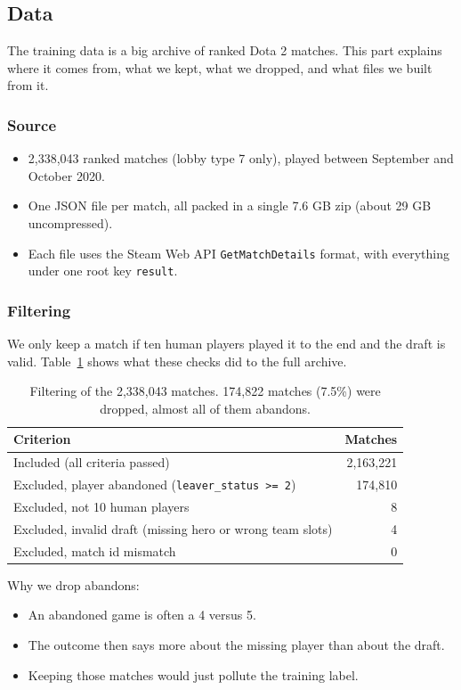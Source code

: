 \documentclass{article}
\begin{document}
\subsection{Data}
The training data is a big archive of ranked Dota 2 matches. This part explains where it comes from, what we kept, what we dropped, and what files we built from it.

\subsubsection*{Source}
\begin{itemize}
    \item 2,338,043 ranked matches (lobby type 7 only), played between September and October 2020.
    \item One JSON file per match, all packed in a single 7.6 GB zip (about 29 GB uncompressed).
    \item Each file uses the Steam Web API \texttt{GetMatchDetails} format, with everything under one root key \texttt{result}.
\end{itemize}

\subsubsection*{Filtering}
We only keep a match if ten human players played it to the end and the draft is valid. Table~\ref{tab:exclusions} shows what these checks did to the full archive.

\begin{table}[h]
\centering
\begin{tabular}{lr}
\toprule
Criterion & Matches \\
\midrule
Included (all criteria passed) & 2,163,221 \\
Excluded, player abandoned (\texttt{leaver\_status >= 2}) & 174,810 \\
Excluded, not 10 human players & 8 \\
Excluded, invalid draft (missing hero or wrong team slots) & 4 \\
Excluded, match id mismatch & 0 \\
\bottomrule
\end{tabular}
\caption{Filtering of the 2,338,043 matches. 174,822 matches (7.5\%) were dropped, almost all of them abandons.}
\label{tab:exclusions}
\end{table}

Why we drop abandons:
\begin{itemize}
    \item An abandoned game is often a 4 versus 5.
    \item The outcome then says more about the missing player than about the draft.
    \item Keeping those matches would just pollute the training label.
\end{itemize}
\end{document}
